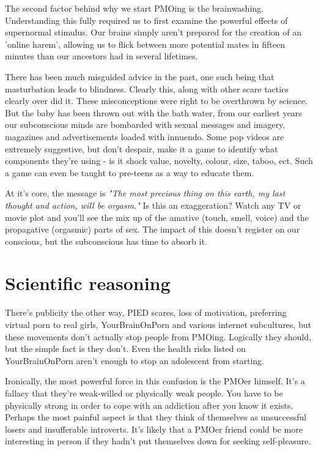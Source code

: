 \documentclass[easypeasy.tex]{subfiles}
\begin{document}
The second factor behind why we start PMOing is the brainwashing. Understanding this fully required us to first examine the powerful effects of supernormal stimulus. Our brains simply aren't prepared for the creation of an 'online harem', allowing us to flick between more potential mates in fifteen minutes than our ancestors had in several lifetimes.

There has been much misguided advice in the past, one such being that masturbation leads to blindness. Clearly this, along with other scare tactics clearly over did it. These misconceptions were right to be overthrown by science. But the baby has been thrown out with the bath water, from our earliest years our subconscious minds are bombarded with sexual messages and imagery, magazines and advertisements loaded with innuendo. Some pop videos are extremely suggestive, but don't despair, make it a game to identify what components they're using - is it shock value, novelty, colour, size, taboo, ect. Such a game can even be taught to pre-teens as a way to educate them.

At it's core, the message is \textit{"The most precious thing on this earth, my last thought and action, will be orgasm."} Is this an exaggeration? Watch any TV or movie plot and you'll see the mix up of the amative (touch, smell, voice) and the propagative (orgasmic) parts of sex. The impact of this doesn't register on our conscious, but the subconscious has time to absorb it.

\section{Scientific reasoning}
There's publicity the other way, PIED scares, loss of motivation, preferring virtual porn to real girls, YourBrainOnPorn and various internet subcultures, but these movements don't actually stop people from PMOing. Logically they should, but the simple fact is they don't. Even the health risks listed on YourBrainOnPorn aren't enough to stop an adolescent from starting.

Ironically, the most powerful force in this confusion is the PMOer himself. It's a fallacy that they're weak-willed or physically weak people. You have to be physically strong in order to cope with an addiction after you know it exists. Perhaps the most painful aspect is that they think of themselves as unsuccessful losers and insufferable introverts. It's likely that a PMOer friend could be more interesting in person if they hadn't put themselves down for seeking self-pleasure.
\end{document}
